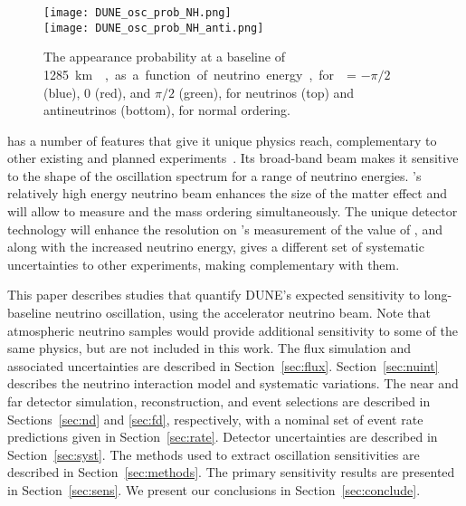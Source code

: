 \begin{figure}[htbp]
  \centering
  \texttt{[image: DUNE\_osc\_prob\_NH.png]}\\
  \texttt{[image: DUNE\_osc\_prob\_NH\_anti.png]}
  \caption[Appearance probabilities for \nue and \anue at \SI{1285}{\km}]{The appearance probability at a baseline of \SI{1285}\km{},
  as a function of neutrino energy, for \deltacp = $-\pi/2$ (blue), 
  0 (red), and $\pi/2$ (green), for neutrinos (top) and antineutrinos
  (bottom), for normal ordering.}
  \label{fig:oscprob}
\end{figure}

 has a number of features that give it unique physics reach, complementary to other existing and planned experiments~\cite{Ayres:2007tu,Abe:2011ks,Abe:2018uyc}. Its broad-band beam makes it sensitive to the shape of the oscillation spectrum for a range of neutrino energies. 's relatively high energy neutrino beam enhances the size of the matter effect and will allow  to measure \deltacp and the mass ordering simultaneously. The unique  detector technology will enhance the resolution on 's measurement of the value of \deltacp, and along with the increased neutrino energy, gives  a different set of systematic uncertainties to other experiments, making  complementary with them.

This paper describes studies that quantify DUNE's expected sensitivity to long-baseline neutrino oscillation, using the accelerator neutrino beam. Note that atmospheric neutrino samples would provide additional sensitivity to some of the same physics, but are not included in this work. The flux simulation and associated uncertainties are described in Section~\ref{sec:flux}. Section~\ref{sec:nuint} describes the neutrino interaction model and systematic variations. The near and far detector simulation, reconstruction, and event selections are described in Sections~\ref{sec:nd} and \ref{sec:fd}, respectively, with a nominal set of event rate predictions given in Section~\ref{sec:rate}. Detector uncertainties are described in Section~\ref{sec:syst}. The methods used to extract oscillation sensitivities are described in Section~\ref{sec:methods}. The primary sensitivity results are presented in Section~\ref{sec:sens}. We present our conclusions in Section~\ref{sec:conclude}.
